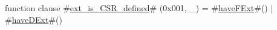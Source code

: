 function clause #\hyperref[sailRISCVzextzyiszyCSRzydefined]{ext\_is\_CSR\_defined}# (0x001, _) = #\hyperref[sailRISCVzhaveFExt]{haveFExt}#() | #\hyperref[sailRISCVzhaveDExt]{haveDExt}#()
